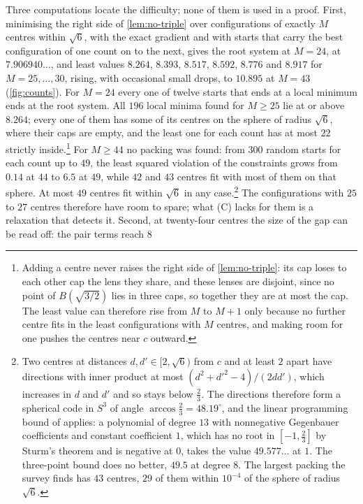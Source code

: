 \documentclass[11pt,reqno]{amsart}
\renewcommand{\_}{\origunderscore\allowbreak}
\numberwithin{equation}{section}
\theoremstyle{plain}
\theoremstyle{definition}
\theoremstyle{remark}
\begin{document}
Three computations locate the difficulty; none of them is used in a
proof. First, minimising the right side of \cref{lem:no-triple} over
configurations of exactly $M$ centres within $\sqrt6$, with the exact
gradient and with starts that carry the best configuration of one count
on to the next, gives the root system at $M=24$, at $7.906940\ldots$, and
least values $8.264$, $8.393$, $8.517$, $8.592$, $8.776$ and $8.917$ for
$M=25,\dots,30$, rising, with occasional small drops, to $10.895$ at $M=43$
(\cref{fig:counts}). For $M=24$ every one of twelve starts that ends at a
local minimum ends at the root system. All $196$ local minima found for
$M\ge25$ lie at or above $8.264$; every one of them has some of its centres
on the sphere of radius $\sqrt6$, where their caps are empty, and the least
one for each count has at most $22$ strictly inside.\footnote{Adding a
  centre never raises the right side of \cref{lem:no-triple}: its cap
  loses to each other cap the lens they share, and these lenses are
  disjoint, since no point of $B(\sqrt{3/2})$ lies in three caps, so
  together they are at most the cap. The least value can therefore rise
  from $M$ to $M+1$ only because no further centre fits in the least
  configurations with $M$ centres, and making room for one pushes the
  centres near $c$ outward.} For $M\ge44$ no packing was found: from $300$
random starts for each count up to $49$, the least squared violation of
the constraints grows from $0.14$ at $44$ to $6.5$ at $49$, while $42$ and
$43$ centres fit with most of them on that sphere. At most $49$ centres
fit within $\sqrt6$ in any case.\footnote{Two centres at distances
  $d,d'\in[2,\sqrt6)$ from $c$ and at least $2$ apart have directions with
  inner product at most $(d^2+d'^2-4)/(2dd')$, which increases in $d$ and
  $d'$ and so stays below $\frac23$. The directions therefore form a
  spherical code in $S^3$ of angle $\arccos\frac23=48.19^\circ$, and the
  linear programming bound of \cite{DGS77} applies: a polynomial of degree
  $13$ with nonnegative Gegenbauer coefficients and constant coefficient
  $1$, which has no root in $[-1,\frac23]$ by Sturm's theorem and is
  negative at $0$, takes the value $49.577\ldots$ at $1$. The three-point
  bound does no better, $49.5$ at degree $8$. The largest packing the
  survey finds has $43$ centres, $29$ of them within $10^{-4}$ of the
  sphere of radius $\sqrt6$.} The configurations with $25$ to $27$ centres therefore have room to spare;
what (C) lacks for them is a relaxation that detects it. Second, at twenty-four
centres the size of the gap can be read off: the pair terms reach $8$
\end{document}
